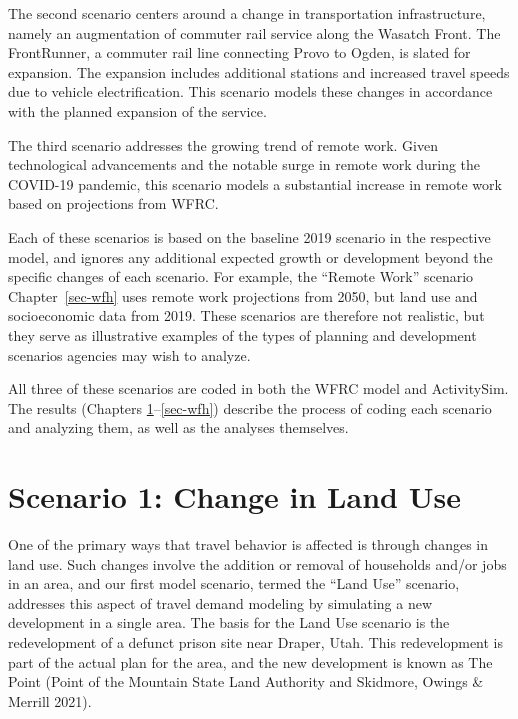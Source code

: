 \documentclass[fancy, oneside, mastersfancy, ms]{byuthesis}
\begin{document}
The second scenario centers around a change in transportation
infrastructure, namely an augmentation of commuter rail service along
the Wasatch Front. The FrontRunner, a commuter rail line connecting
Provo to Ogden, is slated for expansion. The expansion includes
additional stations and increased travel speeds due to vehicle
electrification. This scenario models these changes in accordance with
the planned expansion of the service.

The third scenario addresses the growing trend of remote work. Given
technological advancements and the notable surge in remote work during
the COVID-19 pandemic, this scenario models a substantial increase in
remote work based on projections from WFRC.

Each of these scenarios is based on the baseline 2019 scenario in the
respective model, and ignores any additional expected growth or
development beyond the specific changes of each scenario. For example,
the ``Remote Work'' scenario Chapter~\ref{sec-wfh} uses remote work
projections from 2050, but land use and socioeconomic data from 2019.
These scenarios are therefore not realistic, but they serve as
illustrative examples of the types of planning and development scenarios
agencies may wish to analyze.

All three of these scenarios are coded in both the WFRC model and
ActivitySim. The results (Chapters \ref{sec-landuse}--\ref{sec-wfh})
describe the process of coding each scenario and analyzing them, as well
as the analyses themselves.


\chapter{Scenario 1: Change in Land Use}\label{sec-landuse}

One of the primary ways that travel behavior is affected is through
changes in land use. Such changes involve the addition or removal of
households and/or jobs in an area, and our first model scenario, termed
the ``Land Use'' scenario, addresses this aspect of travel demand
modeling by simulating a new development in a single area. The basis for
the Land Use scenario is the redevelopment of a defunct prison site near
Draper, Utah. This redevelopment is part of the actual plan for the
area, and the new development is known as The Point (Point of the
Mountain State Land Authority and Skidmore, Owings \& Merrill 2021).
\end{document}
